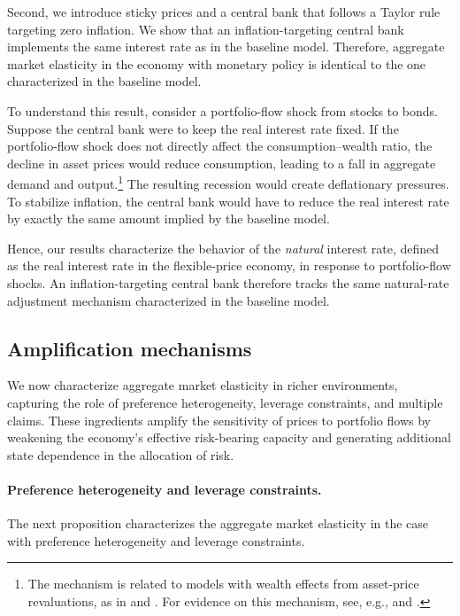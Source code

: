 \documentclass[12pt,english]{article}
\begin{document}
Second, we introduce sticky prices and a central bank that follows a Taylor rule targeting zero inflation.
We show that an inflation-targeting central bank implements the same interest rate as in the baseline model.
Therefore, aggregate market elasticity in the economy with monetary policy is identical to the one characterized in the baseline model.

To understand this result, consider a portfolio-flow shock from stocks to bonds.
Suppose the central bank were to keep the real interest rate fixed.
If the portfolio-flow shock does not directly affect the consumption--wealth ratio, the decline in asset prices would reduce consumption, leading to a fall in aggregate demand and output.\footnote{
The mechanism is related to models with wealth effects from asset-price revaluations, as in \citet{CaballeroSimsek2020RiskCentric} and \citet{CarampSilva2026wealth}.
For evidence on this mechanism, see, e.g.,  \citet{CieslakVissingJorgensen2021FedPut} and \citet{ChodorowReichNenovSimsek2021}.
}
The resulting recession would create deflationary pressures.
To stabilize inflation, the central bank would have to reduce the real interest rate by exactly the same amount implied by the baseline model.

Hence, our results characterize the behavior of the \textit{natural} interest rate, defined as the real interest rate in the flexible-price economy, in response to portfolio-flow shocks.
An inflation-targeting central bank therefore tracks the same natural-rate adjustment mechanism characterized in the baseline model.


\subsection{Amplification mechanisms}

We now characterize aggregate market elasticity in richer environments, capturing the role of preference heterogeneity, leverage constraints, and multiple claims.
These ingredients amplify the sensitivity of prices to portfolio flows by weakening the economy's effective risk-bearing capacity and generating additional state dependence in the allocation of risk.

\paragraph{Preference heterogeneity and leverage constraints.}
The next proposition characterizes the aggregate market elasticity in the case with preference heterogeneity and leverage constraints.
\end{document}

